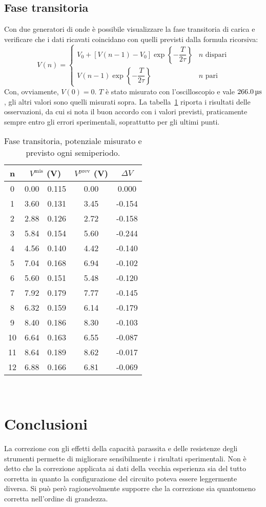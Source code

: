 \documentclass[italian,a4paper]{article}
\begin{document}
\subsection{Fase transitoria}
Con due generatori di onde è possibile visualizzare la fase transitoria di carica e verificare che i dati ricavati coincidano con quelli previsti dalla formula ricorsiva:
\begin{equation*}
 V(n) = \begin{cases}
         V_0 + [V(n-1)-V_0]\exp\left\{-\dfrac{T}{2\tau}\right\} & n\text{ dispari}\\
         V(n-1)\exp\left\{-\dfrac{T}{2\tau}\right\} & n\text{ pari}
        \end{cases}
\end{equation*}
Con, ovviamente, $V(0) = 0$. $T$ è stato misurato con l'oscilloscopio e vale $\unit[266.0]{\micro s}$, gli altri valori sono quelli misurati sopra. La tabella~\ref{transitoria} riporta i risultati delle osservazioni, da cui si nota il buon accordo con i valori previsti, praticamente sempre entro gli errori sperimentali, soprattutto per gli ultimi punti.
\begin{table}[p]\caption{Fase transitoria, potenziale misurato e previsto ogni semiperiodo.}\label{transitoria}
\centering
 \begin{tabular}{c r@{$\pm$}l c c}
n &\multicolumn{2}{c}{$V^\text{mis}$ (\unit{V})} & $V^\text{prev}$ (\unit{V}) & $\Delta V$\\\hline
0 &0.00 &0.115 &0.00 &0.000\\
1 &3.60 &0.131 &3.45 &-0.154\\
2 &2.88 &0.126 &2.72 &-0.158\\
3 &5.84 &0.154 &5.60 &-0.244\\
4 &4.56 &0.140 &4.42 &-0.140\\
5 &7.04 &0.168 &6.94 &-0.102\\
6 &5.60 &0.151 &5.48 &-0.120\\
7 &7.92 &0.179 &7.77 &-0.145\\
8 &6.32 &0.159 &6.14 &-0.179\\
9 &8.40 &0.186 &8.30 &-0.103\\
10 &6.64 &0.163 &6.55 &-0.087\\
11 &8.64 &0.189 &8.62 &-0.017\\
12 &6.88 &0.166 &6.81 &-0.069\\
 \end{tabular}
\end{table}\\
\section{Conclusioni}
La correzione con gli effetti della capacità parassita e delle resistenze degli strumenti permette di migliorare sensibilmente i risultati sperimentali. Non è detto che la correzione applicata ai dati della vecchia esperienza sia del tutto corretta in quanto la configurazione del circuito poteva essere leggermente diversa. Si può però ragionevolmente supporre che la correzione sia quantomeno corretta nell'ordine di grandezza.
\end{document}
